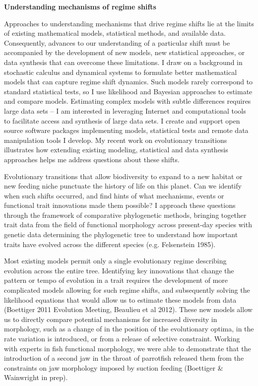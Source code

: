 

\textbf{Understanding mechanisms of regime shifts}

Approaches to understanding mechanisms that drive regime shifts lie at the limits of existing mathematical models, statistical methods, and available data.  Consequently, advances to our understanding of a particular shift must be accompanied by the development of new models, new statistical approaches, or data synthesis that can overcome these limitations.  I draw on a background in stochastic calculus and dynamical systems to formulate better mathematical models that can capture regime shift dynamics.  Such models rarely correspond to standard statistical tests, so I use likelihood and Bayesian approaches to estimate and compare models.   Estimating complex models with subtle differences requires large data sets -- I am interested in leveraging Internet and computational tools to facilitate access and synthesis of large data sets.  I create and support open source software packages implementing models, statistical tests and remote data manipulation tools I develop.   My recent work on evolutionary transitions illustrates how extending existing modeling, statistical and data synthesis approaches helps me address questions about these shifts.  

Evolutionary transitions that allow biodiversity to expand to a new habitat or new feeding niche punctuate the history of life on this planet.  Can we identify when such shifts occurred, and find hints of what mechanisms, events or functional trait innovations made them possible?  I approach these questions through the framework of comparative phylogenetic methods, bringing together trait data from the field of functional morphology across present-day species with genetic data determining the phylogenetic tree to understand how important traits have evolved across the different species (e.g. Felsenstein 1985).

Most existing models permit only a single evolutionary regime describing evolution across the entire tree.  Identifying key innovations that change the pattern or tempo of evolution in a trait requires the development of more complicated models allowing for such regime shifts, and subsequently solving the likelihood equations that would allow us to estimate these models from data (Boettiger 2011 Evolution Meeting, Beaulieu et al 2012).   These new models allow us to directly compare potential mechanisms for increased diversity in morphology, such as a change of in the position of the evolutionary optima, in the rate variation is introduced, or from a release of selective constraint.  Working with experts in fish functional morphology, we were able to demonstrate that the introduction of a second jaw in the throat of parrotfish released them from the constraints on jaw morphology imposed by suction feeding (Boettiger \& Wainwright in prep).  

